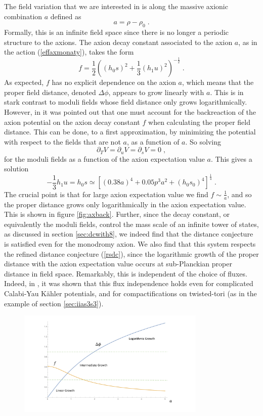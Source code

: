 \documentclass[11pt,a4paper]{article}
\numberwithin{equation}{section}
\numberwithin{table}{section}\setlength{\multlinegap}{25pt}
\newcommand{\be}{\begin{equation}}
\newcommand{\ee}{\end{equation}}
\begin{document}
{The field variation that we are interested in is along the massive axionic combination $a$ defined as
\be
a = \rho - \rho_0 \;.
\ee
Formally, this is an infinite field space since there is no longer a periodic structure to the axions. The axion decay constant associated to the axion $a$, as in the action (\ref{effaxmonaty}), takes the form
\be
f = \frac12 \left( \left(h_0 s\right)^2 + \frac13 \left(h_1 u\right)^2 \right)^{-\frac12} \;.
\ee
As expected, $f$ has no explicit dependence on the axion $a$, which means that the proper field distance, denoted $\Delta \phi$, appears to grow linearly with $a$. This is in stark contrast to moduli fields whose field distance only grows logarithmically. However, in \cite{Baume:2016psm} it was pointed out that one must account for the backreaction of the axion potential on the axion decay constant $f$ when calculating the proper field distance. This can be done, to a first approximation, by minimizing the potential with respect to the fields that are not $a$, as a function of $a$. So solving
\be
\partial_T V = \partial_u V = \partial_s V = 0 \;,
\ee
for the moduli fields as a function of the axion expectation value $a$. This gives a solution
\be
-\frac{1}{3} h_1 u = h_0 s \simeq \left[ \left( 0.38 a \right)^4 + 0.05 p^3 a^2 + \left(h_0 s_0 \right)^4 \right]^{\frac14} \;.
\ee
The crucial point is that for large axion expectation value we find $f \sim \frac{1}{a}$, and so the proper distance grows only logarithmically in the axion expectation value. This is shown in figure \ref{fig:axback}. Further, since the decay constant, or equivalently the moduli fields, control the mass scale of an infinite tower of states, as discussed in section \ref{sec:dcwith8}, we indeed find that the distance conjecture is satisfied even for the monodromy axion. We also find that this system respects the refined distance conjecture (\ref{rsdc}), since the logarithmic growth of the proper distance with the axion expectation value occurs at sub-Planckian proper distance in field space. Remarkably, this is independent of the choice of fluxes. Indeed, in \cite{Baume:2016psm}, it was shown that this flux independence holds even for complicated Calabi-Yau K{\"a}hler potentials, and for compactifications on twisted-tori (as in the example of section \ref{sec:iias3s3}).  
\begin{figure}[t]
\centering
 \includegraphics[width=0.8\textwidth]{axmondpl.pdf}

\end{figure}}
\end{document}
